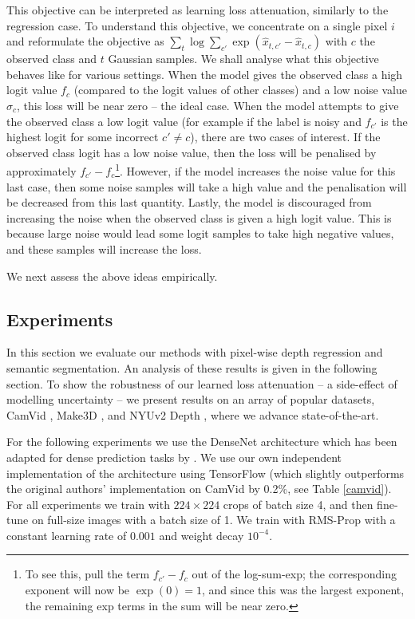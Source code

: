 This objective can be interpreted as learning loss attenuation, similarly to the regression case.
To understand this objective, we concentrate on a single pixel $i$ and reformulate the objective as $\sum_{t} \log \sum_{c'} \exp (\hat{x}_{t,c'} - \hat{x}_{t,c})$ with $c$ the observed class and $t$ Gaussian samples. We shall analyse what this objective behaves like for various settings.
When the model gives the observed class a high logit value $f_{c}$ (compared to the logit values of other classes) and a low noise value $\sigma_{c}$, this loss will be near zero -- the ideal case. When the model attempts to give the observed class a low logit value (for example if the label is noisy and $f_{c'}$ is the highest logit for some incorrect $c' \neq c$), there are two cases of interest. If the observed class logit has a low noise value, then the loss will be penalised by approximately $f_{c'} - f_{c}$\footnote{To see this, pull the term $f_{c'} - f_{c}$ out of the log-sum-exp; the corresponding exponent will now be $\exp(0)=1$, and since this was the largest exponent, the remaining exp terms in the sum will be near zero.}. However, if the model increases the noise value for this last case, then some noise samples will take a high value and the penalisation will be decreased from this last quantity. Lastly, the model is discouraged from increasing the noise when the observed class is given a high logit value. This is because large noise would lead some logit samples to take high negative values, and these samples will increase the loss.


We next assess the above ideas empirically.


\subsection{Experiments}
\label{sec:results}

In this section we evaluate our methods with pixel-wise depth regression and semantic segmentation. An analysis of these results is given in the following section. To show the robustness of our learned loss attenuation -- a side-effect of modelling uncertainty -- we present results on an array of popular datasets, CamVid \citep{brostow2009semantic}, Make3D \citep{saxena2009make3d}, and NYUv2 Depth \citep{silberman2012indoor}, where we advance state-of-the-art.


For the following experiments we use the DenseNet architecture \citep{huang2016densely} which has been adapted for dense prediction tasks by \citep{jegou2016one}. We use our own independent implementation of the architecture using TensorFlow \citep{abadi2016tensorflow} (which slightly outperforms the original authors' implementation on CamVid by 0.2\%, see Table \ref{camvid}). For all experiments we train with $224\times224$ crops of batch size 4, and then fine-tune on full-size images with a batch size of 1. We train with RMS-Prop with a constant learning rate of $0.001$ and weight decay $10^{-4}$.



